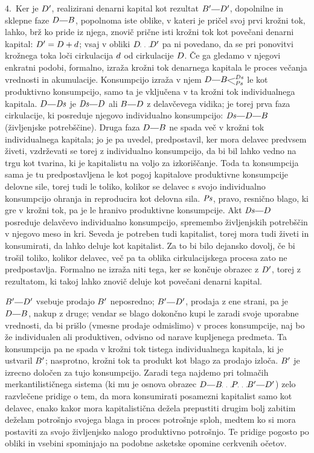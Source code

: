 \documentclass[kapital_02.tex]{subfiles}
\begin{document}
4.\ Ker je \(D'\), realizirani denarni kapital kot rezultat \(\KPEB'\KPEcrta\KPED'\), dopolnilne in sklepne faze \(\KPED\KPEcrta\KPEB\), popolnoma iste oblike, v kateri je pričel svoj prvi krožni tok, lahko, brž ko pride iz njega, znovič prične isti krožni tok kot povečani denarni kapital: \(D' = D + d\); vsaj v obliki \(\KPED\KPEpike\KPED'\) pa ni povedano, da se pri ponovitvi krožnega toka loči cirkulacija \(d\) od cirkulacije \(D\). Če ga gledamo v njegovi enkratni podobi, formalno, izraža krožni tok denarnega kapitala le proces večanja vrednosti in akumulacije. Konsumpcijo izraža v njem \(\KPED\KPEcrta\KPEBrazcepDsPs\) le kot produktivno konsumpcijo, samo ta je vključena v ta krožni tok individualnega kapitala. \(\KPED\KPEcrta\KPEDs\) je \(\KPEDs\KPEcrta\KPED\) ali \(\KPEB\KPEcrta\KPED\) z delavčevega vidika; je torej prva faza cirkulacije, ki posreduje njegovo individualno konsumpcijo: \(\KPEDs\KPEcrta\KPED\KPEcrta\KPEB\) (življenjske potrebščine). Druga faza \(\KPED\KPEcrta\KPEB\) ne spada več v krožni tok individualnega kapitala; jo je pa uvedel, predpostavil, ker mora delavec predvsem živeti, vzdrževati se torej z individualno konsumpcijo, da bi bil lahko vedno na trgu kot tvarina, ki je kapitalistu na voljo za izkoriščanje. Toda ta konsumpcija sama je tu predpostavljena le kot pogoj kapitalove produktivne konsumpcije delovne sile, torej tudi le toliko, kolikor se delavec s svojo individualno konsumpcijo ohranja in reproducira kot delovna sila. \(\mathit{Ps}\), pravo, resnično blago, ki gre v krožni tok, pa je le hranivo produktivne konsumpcije. Akt \(\KPEDs\KPEcrta\KPED\) posreduje delavčevo individualno konsumpcijo, spremembo življenjskih potrebščin v njegovo meso in kri. Seveda je potreben tudi kapitalist, torej mora tudi živeti in konsumirati, da lahko deluje kot kapitalist. Za to bi bilo dejansko dovolj, če bi trošil toliko, kolikor delavec, več pa ta oblika cirkulacijskega procesa zato ne predpostavlja. Formalno ne izraža niti tega, ker se končuje obrazec z \(D'\), torej z rezultatom, ki takoj lahko znovič deluje kot povečani denarni kapital.

\(\KPEB'\KPEcrta\KPED'\) vsebuje prodajo \(B'\) neposredno; \(\KPEB'\KPEcrta\KPED'\), prodaja z ene strani, pa je \(\KPED\KPEcrta\KPEB\), nakup z druge; vendar se blago dokončno kupi le zaradi svoje uporabne vrednosti, da bi prišlo (vmesne prodaje odmislimo) v proces konsumpcije, naj bo že individualen ali produktiven, odvisno od narave kupljenega predmeta. Ta konsumpcija pa ne spada v krožni tok tistega individualnega kapitala, ki je ustvaril \(B'\); nasprotno, krožni tok ta produkt kot blago za prodajo izloča. \(B'\) je izrecno določen za tujo konsumpcijo. Zaradi tega najdemo pri tolmačih merkantilističnega sistema (ki mu je osnova obrazec \(\KPED\KPEcrta\KPEB\KPEpike\KPEP\KPEpike\KPEB'\KPEcrta\KPED'\)) zelo razvlečene pridige o tem, da mora konsumirati posamezni kapitalist samo kot delavec, enako kakor mora kapitalistična dežela prepustiti drugim bolj zabitim deželam potrošnjo svojega blaga in proces potrošnje sploh, medtem ko si mora postaviti za svojo življenjsko nalogo produktivno potrošnjo. Te pridige pogosto po obliki in vsebini spominjajo na podobne asketske opomine cerkvenih očetov.
\end{document}
